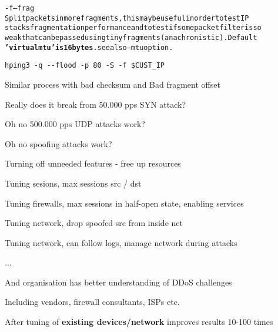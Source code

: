 \documentclass[Screen16to9,17pt]{foils}
\begin{document}
\begin{alltt}\small
-f --frag
    Split  packets  in more fragments, this may be useful in order to test IP
    stacks fragmentation performance and to test if some packet filter is  so
    weak  that  can  be  passed using tiny fragments (anachronistic). Default
    {\bf 'virtual mtu' is 16 bytes}. see also --mtu option.
\end{alltt}

\begin{list1}
\item \verb+hping3 -q --flood -p 80 -S -f $CUST_IP+
\item Similar process with bad checksum and Bad fragment offset
\end{list1}



\centerline{Really does it break from 50.000 pps SYN attack?}



\centerline{Oh no 500.000 pps UDP attacks work?}


\centerline{Oh no spoofing attacks work?}





\begin{list1}
\item Turning off unneeded features - free up resources
\item Tuning sesions, max sessions src / dst
\item Tuning firewalls, max sessions in half-open state, enabling services
\item Tuning network, drop spoofed src from inside net \smiley
\item Tuning network, can follow logs, manage network during attacks
\item ...
\item And organisation has better understanding of DDoS challenges
\item Including vendors, firewall consultants, ISPs etc.
\end{list1}

\vskip 1cm
\centerline{After tuning of {\bf existing devices/network} improves results 10-100 times}
\end{document}
